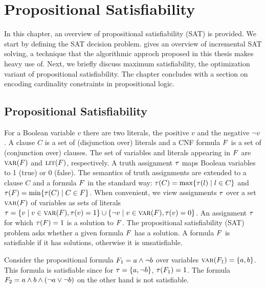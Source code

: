 \chapter{Propositional Satisfiability\label{chap:satisfiability}}

In this chapter, an overview of propositional satisfiability (SAT) is provided.
We start by defining the SAT decision problem.
 gives an overview of incremental SAT solving, a technique that the algorithmic approch proposed in this thesis makes heavy use of.
Next, we briefly discuss maximum satisfiability, the optimization variant of propositional satisfiability.
The chapter concludes with a section on encoding cardinality constraints in propositional logic.

\section{Propositional Satisfiability\label{sec:sat}}

For a Boolean variable $v$ there are two literals, the positive $v$ and the negative $\lnot v$. 
A clause $C$ is a set of (disjunction over) literals and a CNF formula $F$ is a set of (conjunction over) clauses.
The set of variables and literals appearing in $F$ are $\textsc{var}(F)$ and $\textsc{lit}(F)$, respectively.  
A truth assignment $\tau$ maps Boolean variables to 1 (true) or 0 (false).
The semantics of truth assignments are extended to a clause $C$ and a formula $F$ in the standard way: $\tau(C) = \max\{ \tau(l) \mid l \in C\}$ and $\tau(F) = \min\{\tau(C) \mid C \in F\}$.
When convenient, we view assignments $\tau$ over a set $\textsc{var}(F)$ of variables as sets of literals $\tau = \{ v \mid v \in \textsc{var}(F),  \tau(v) = 1\} \cup \{ \lnot v \mid v \in \textsc{var}(F), \tau(v) = 0\}$.
An assignment $\tau$ for which $\tau(F) = 1$ is a solution to $F$.
The propositional satisfiability (SAT) problem asks whether a given formula $F$ has a solution.
A formula $F$ is satisfiable if it has solutions, otherwise it is unsatisfiable.

\begin{example}
  Consider the propositional formula $F_1 = a \land \lnot b$ over variables $\textsc{var}(F_1) = \{a,b\}$.
  This formula is satisfiable since for $\tau=\{a,\lnot b\}$, $\tau(F_1)=1$.
  The formula $F_2 = a \land b \land (\lnot a \lor \lnot b)$ on the other hand is not satisfiable.
\end{example}

